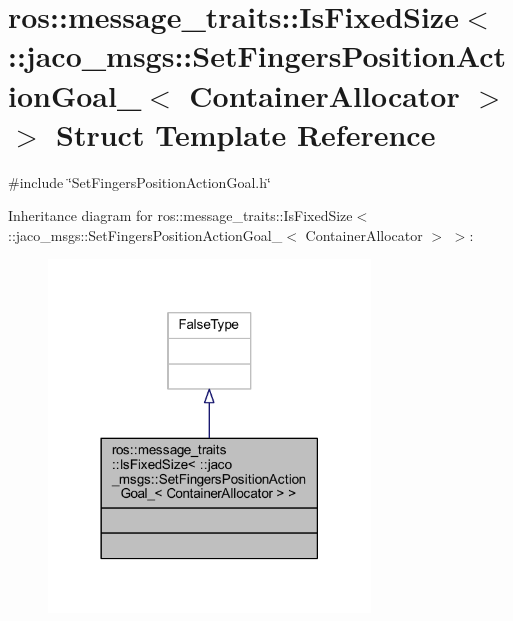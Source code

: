 \hypertarget{structros_1_1message__traits_1_1IsFixedSize_3_01_1_1jaco__msgs_1_1SetFingersPositionActionGoal__85342a82537d288e6c9f33743bb7590b}{}\section{ros\+:\+:message\+\_\+traits\+:\+:Is\+Fixed\+Size$<$ \+:\+:jaco\+\_\+msgs\+:\+:Set\+Fingers\+Position\+Action\+Goal\+\_\+$<$ Container\+Allocator $>$ $>$ Struct Template Reference}
\label{structros_1_1message__traits_1_1IsFixedSize_3_01_1_1jaco__msgs_1_1SetFingersPositionActionGoal__85342a82537d288e6c9f33743bb7590b}


{\ttfamily \#include \char`\"{}Set\+Fingers\+Position\+Action\+Goal.\+h\char`\"{}}



Inheritance diagram for ros\+:\+:message\+\_\+traits\+:\+:Is\+Fixed\+Size$<$ \+:\+:jaco\+\_\+msgs\+:\+:Set\+Fingers\+Position\+Action\+Goal\+\_\+$<$ Container\+Allocator $>$ $>$\+:
\nopagebreak
\begin{figure}[H]
\begin{center}
\leavevmode
\includegraphics[width=242pt]{d2/d0d/structros_1_1message__traits_1_1IsFixedSize_3_01_1_1jaco__msgs_1_1SetFingersPositionActionGoal__04bc0dd9fe5f309135ba8785b41e3b26}
\end{center}
\end{figure}


